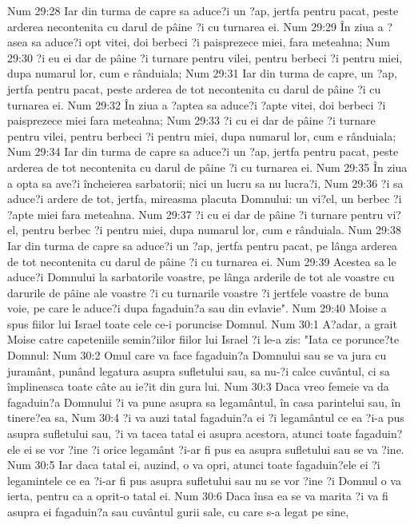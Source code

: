 Num 29:28  Iar din turma de capre sa aduce?i un ?ap, jertfa pentru pacat, peste arderea necontenita cu darul de pâine ?i cu turnarea ei.
Num 29:29  În ziua a ?asea sa aduce?i opt vitei, doi berbeci ?i paisprezece miei, fara meteahna;
Num 29:30  ?i eu ei dar de pâine ?i turnare pentru vilei, pentru berbeci ?i pentru miei, dupa numarul lor, cum e rânduiala;
Num 29:31  Iar din turma de capre, un ?ap, jertfa pentru pacat, peste arderea de tot necontenita cu darul de pâine ?i cu turnarea ei.
Num 29:32  În ziua a ?aptea sa aduce?i ?apte vitei, doi berbeci ?i paisprezece miei fara meteahna;
Num 29:33  ?i cu ei dar de pâine ?i turnare pentru vilei, pentru berbeci ?i pentru miei, dupa numarul lor, cum e rânduiala;
Num 29:34  Iar din turma de capre sa aduce?i un ?ap, jertfa pentru pacat, peste arderea de tot necontenita cu darul de pâine ?i cu turnarea ei.
Num 29:35  În ziua a opta sa ave?i încheierea sarbatorii; nici un lucru sa nu lucra?i,
Num 29:36  ?i sa aduce?i ardere de tot, jertfa, mireasma placuta Domnului: un vi?el, un berbec ?i ?apte miei fara meteahna.
Num 29:37  ?i cu ei dar de pâine ?i turnare pentru vi?el, pentru berbec ?i pentru miei, dupa numarul lor, cum e rânduiala.
Num 29:38  Iar din turma de capre sa aduce?i un ?ap, jertfa pentru pacat, pe lânga arderea de tot necontenita cu darul de pâine ?i cu turnarea ei.
Num 29:39  Acestea sa le aduce?i Domnului la sarbatorile voastre, pe lânga arderile de tot ale voastre cu darurile de pâine ale voastre ?i cu turnarile voastre ?i jertfele voastre de buna voie, pe care le aduce?i dupa fagaduin?a sau din evlavie".
Num 29:40  Moise a spus fiilor lui Israel toate cele ce-i poruncise Domnul.
Num 30:1  A?adar, a grait Moise catre capeteniile semin?iilor fiilor lui Israel ?i le-a zis: "Iata ce porunce?te Domnul:
Num 30:2  Omul care va face fagaduin?a Domnului sau se va jura cu juramânt, punând legatura asupra sufletului sau, sa nu-?i calce cuvântul, ci sa împlineasca toate câte au ie?it din gura lui.
Num 30:3  Daca vreo femeie va da fagaduin?a Domnului ?i va pune asupra sa legamântul, în casa parintelui sau, în tinere?ea sa,
Num 30:4  ?i va auzi tatal fagaduin?a ei ?i legamântul ce ea ?i-a pus asupra sufletului sau, ?i va tacea tatal ei asupra acestora, atunci toate fagaduin?ele ei se vor ?ine ?i orice legamânt ?i-ar fi pus ea asupra sufletului sau se va ?ine.
Num 30:5  Iar daca tatal ei, auzind, o va opri, atunci toate fagaduin?ele ei ?i legamintele ce ea ?i-ar fi pus asupra sufletului sau nu se vor ?ine ?i Domnul o va ierta, pentru ca a oprit-o tatal ei.
Num 30:6  Daca însa ea se va marita ?i va fi asupra ei fagaduin?a sau cuvântul gurii sale, cu care s-a legat pe sine,
